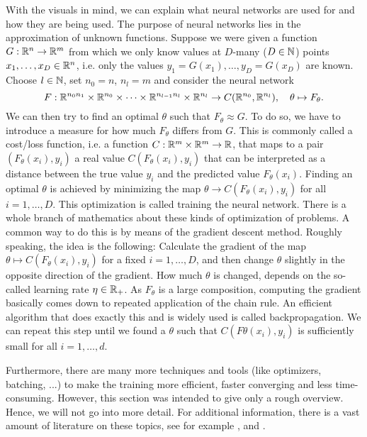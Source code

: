 With the visuals in mind, we can explain what neural networks are used for and how they are being used. 
The purpose of neural networks lies in the  approximation of unknown functions. 
Suppose we were given a function $G:\mathbb{R}^n\to\mathbb{R}^m$ from which we only know values at $D$-many ($D\in\mathbb{N}$) points $x_1,\dots,x_D\in\mathbb{R}^n$, 
i.e. only the values $y_1=G(x_1),\dots,y_D=G(x_D)$ are known.
Choose $l\in\mathbb{N}$, set $n_0=n$, $n_l=m$ and consider the neural network
\begin{equation*}
    F:\mathbb{R}^{n_0n_1}\times\mathbb{R}^{n_0}\times\dots\times\mathbb{R}^{n_{l-1}n_l}\times\mathbb{R}^{n_l}\to C(\mathbb{R}^{n_0},\mathbb{R}^{n_l}), \quad\theta\mapsto F_\theta.
\end{equation*}
We can then try to find an \glqq{}optimal\grqq{} $\theta$ such that $F_\theta\approx G$. 
To do so, we have to introduce a measure for how much $F_\theta$ differs from $G$. 
This is commonly called a cost/loss function, i.e. a function $C:\mathbb{R}^m\times\mathbb{R}^m\to\mathbb{R}$, that maps to a pair $(F_\theta(x_i), y_i)$ a real value
$C(F_\theta(x_i),y_i)$ that can be interpreted as a distance between the true value $y_i$ and the predicted value $F_\theta(x_i)$.
Finding an optimal $\theta$ is achieved by minimizing the map $\theta\to C(F_\theta(x_i),y_i)$ for all $i=1,\dots,D$.
This optimization is called \glqq{}training the neural network\grqq{}. 
There is a whole branch of mathematics about these kinds of optimization of problems. 
A common way to do this is by means of the gradient descent method.
Roughly speaking, the idea is the following: Calculate the gradient of the map $\theta\mapsto C(F_\theta(x_i),y_i)$ for a fixed $i=1,\dots,D$, 
and then change $\theta$ slightly in the opposite direction of the gradient. 
How much $\theta$ is changed, depends on the so-called learning rate $\eta\in\mathbb{R}_+$. 
As $F_\theta$ is a large composition, computing the gradient basically comes down to repeated application of the chain rule. 
An efficient algorithm that does exactly this and is widely used is called backpropagation. We can repeat this step until we found a $\theta$ such that 
$C(F\theta(x_i),y_i)$ is sufficiently small for all $i=1,\dots,d$.

Furthermore, there are many more techniques and tools (like optimizers, batching, ...) to make the training more efficient, faster converging and less time-consuming. 
However, this section was intended to give only a rough overview. Hence, we will not go into more detail. 
For additional information, there is a vast amount of literature on these topics, see for example \cite{bookNN1}, \cite{bookNN2} and \cite{paperHyperparameter}.